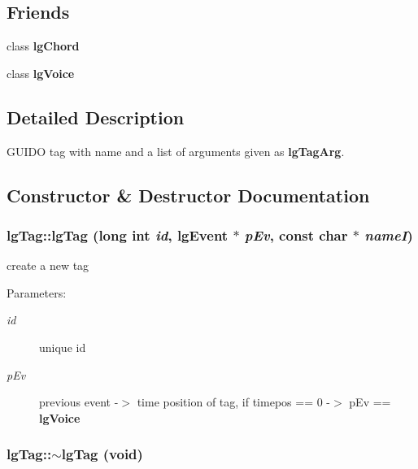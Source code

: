\subsection*{Friends}
\begin{CompactItemize}
\item 
class {\bf lg\-Chord}
\item 
class {\bf lg\-Voice}
\end{CompactItemize}


\subsection{Detailed Description}
GUIDO tag with name and a list of arguments given as {\bf lg\-Tag\-Arg}. 



\subsection{Constructor \& Destructor Documentation}
\subsubsection{\setlength{\rightskip}{0pt plus 5cm}lg\-Tag::lg\-Tag (long int {\em id}, {\bf lg\-Event} $\ast$ {\em p\-Ev}, const char $\ast$ {\em name\-I})}\label{classlgTag_a8}


create a new tag 

\begin{Desc}
\item[Parameters: ]\par
\begin{description}
\item[{\em 
id}]unique id \item[{\em 
p\-Ev}]previous event -$>$ time position of tag, if timepos == 0 -$>$ p\-Ev == {\bf lg\-Voice} \end{description}
\end{Desc}
\subsubsection{\setlength{\rightskip}{0pt plus 5cm}lg\-Tag::$\sim${\bf lg\-Tag} (void)\hspace{0.3cm}{\tt  [virtual]}}\label{classlgTag_a9}




